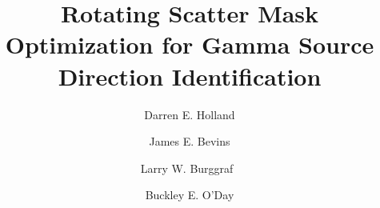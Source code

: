 \documentclass[3p,times]{elsarticle}
\begin{document}
\begin{frontmatter}



\dochead{}

\title{Rotating Scatter Mask Optimization for Gamma Source Direction Identification}


\author[d1]{Darren E. Holland}
\author[d2]{James E. Bevins}
\author[d2]{Larry W. Burggraf\ }
\author[d2]{Buckley E. O'Day}

\address[d1]{dholland@cedarville.edu\\
  Department of Mechanical Engineering\\
	Cedarville University \\
	Cedarville, OH\\}
	
\address[d2]{Department of Engineering Physics\\
	Air Force Institute of Technology \\
	Wright-Patterson AFB, OH\\}


\end{frontmatter}
\end{document}
